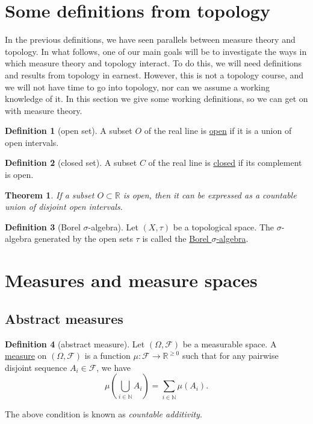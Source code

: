 \documentclass[a4paper]{scrartcl}
\newcommand{\R}{\mathbb{R}}
\newcommand{\N}{\mathbb{N}}
\newcommand{\defn}[1]{\ul{#1}}
\theoremstyle{definition}
\newtheorem{definition}{Definition}[section]
\theoremstyle{plain}
\newtheorem{theorem}{Theorem}[section]
\theoremstyle{remark}
\begin{document}
\section{Some definitions from topology}
In the previous definitions, we have seen parallels between measure theory and topology. In what follows, one of our main goals will be to investigate the ways in which measure theory and topology interact. To do this, we will need definitions and results from topology in earnest. However, this is not a topology course, and we will not have time to go into topology, nor can we assume a working knowledge of it. In this section we give some working definitions, so we can get on with measure theory.

\begin{definition}[open set]
  \label{def:openset}
  A subset $O$ of the real line is \defn{open} if it is a union of open intervals.
\end{definition}

\begin{definition}[closed set]
  \label{def:closedset}
  A subset $C$ of the real line is \defn{closed} if its complement is open.
\end{definition}

\begin{theorem}
  If a subset $O \subset \R$ is open, then it can be expressed as a countable union of disjoint open intervals.
\end{theorem}

\begin{definition}[Borel $\sigma$-algebra]
  \label{def:borelsigmaalgebra}
  Let $(X, \tau)$ be a topological space. The $\sigma$-algebra generated by the open sets $\tau$ is called the \defn{Borel $\sigma$-algebra}.
\end{definition}

\section{Measures and measure spaces}
\subsection{Abstract measures}
\begin{definition}[abstract measure]
  \label{def:abstractmeasure}
  Let $(\Omega, \mathcal{F})$ be a measurable space. A \defn{measure} on $(\Omega, \mathcal{F})$ is a function $\mu\colon \mathcal{F} \to \R^{\geq 0}$ such that for any pairwise disjoint sequence $A_{i} \in \mathcal{F}$, we have
  \begin{equation*}
    \mu\left( \bigcup_{i \in \N} A_{i} \right) = \sum_{i \in \N} \mu(A_{i}).
  \end{equation*}

  The above condition is known as \emph{countable additivity}.
\end{definition}
\end{document}
